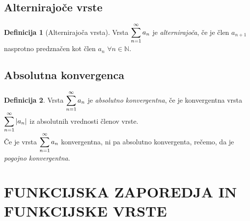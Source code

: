 \documentclass[11pt]{article}
\theoremstyle{definition}
\newtheorem{definicija}{Definicija}[section]
\theoremstyle{definition}
\theoremstyle{definition}
\theoremstyle{theorem}
\begin{document}

\subsection{Alternirajoče vrste}
\vspace{0.5cm}

\begin{definicija}[Alternirajoča vrsta]

Vrsta $\mathlarger{\sum_{n=1}^{\infty} a_n}$ je \textit{alternirajoča}, če je člen $a_{n+1}$ nasprotno predznačen kot člen $a_n$ $\forall n \in \mathbb{N}$.

\end{definicija}
\vspace{0.5cm}


\subsection{Absolutna konvergenca}

\begin{definicija}

Vrsta $\mathlarger{\sum_{n=1}^{\infty} a_n}$ je \textit{absolutno konvergentna}, če je konvergentna vrsta $\mathlarger{\sum_{n=1}^{\infty} |a_n|}$ iz absolutnih vrednosti členov vrste. \\
Če je vrsta $\mathlarger{\sum_{n=1}^{\infty} a_n}$ konvergentna, ni pa absolutno konvergenta, rečemo, da je \textit{pogojno konvergentna}.

\end{definicija}
\vspace{0.5cm}


\pagebreak


\section{FUNKCIJSKA ZAPOREDJA IN FUNKCIJSKE VRSTE}
\vspace{0.5cm}

\end{document}
